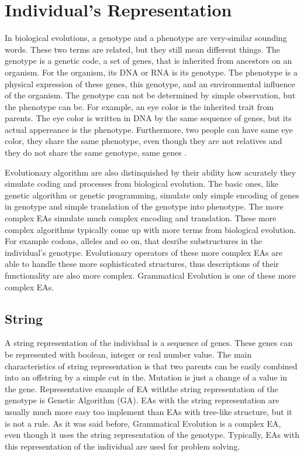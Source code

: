 
\section{Individual's Representation}
In biological evolutions, a genotype and a phenotype are very-similar sounding words. These two terms are related, but they still mean different things.
The genotype is a genetic code, a set of genes, that is inherited from ancestors on an organism. For the organism, its DNA or RNA is its genotype.
The phenotype is a physical expression of these genes, this genotype, and an environmental influence of the organism.
The genotype can not be determined by simple observation, but the phenotype can be. For example, an eye color is the inherited trait from parents. The eye color is written in DNA by the same sequence of genes, but its actual appereance is the phenotype. Furthermore, two people can have same eye color, they share the same phenotype, even though they are not relatives and they do not share the same genotype, same genes \cite{genotype-phenotype}.

Evolutionary algorithm are also distinquished by their ability how acurately they simulate coding and processes from biological evolution. The basic ones, like genetic algorithm or genetic programming, simulate only simple encoding of genes in genotype and simple translation of the genotype into phenotype. The more complex EAs simulate much complex encoding and translation. These more complex algorithms typically come up with more terms from biological evolution. For example codons, alleles and so on, that desribe substructures in the individual's genotype. Evolutionary operators of these more complex EAs are able to handle these more sophisticated structures, thus descriptions of their functionality are also more complex. Grammatical Evolution is one of these more complex EAs.

\subsection{String}
A string representation of the individual is a sequence of genes. These genes can be represented with boolean, integer or real number value.
The main characteristics of string representation is that two parents can be easily combined into an offstring by a simple cut in the. Mutation is just a change of a value in the gene. Representative example of EA withthe string representation of the genotype is Genetic Algorithm (GA). EAs with the string representation are usually much more easy too implement than EAs with tree-like structure, but it is not a rule. As it was said before, Grammatical Evolution is a complex EA, even though it uses the string representation of the genotype. Typically, EAs with this representation of the individual are used for problem solving.

